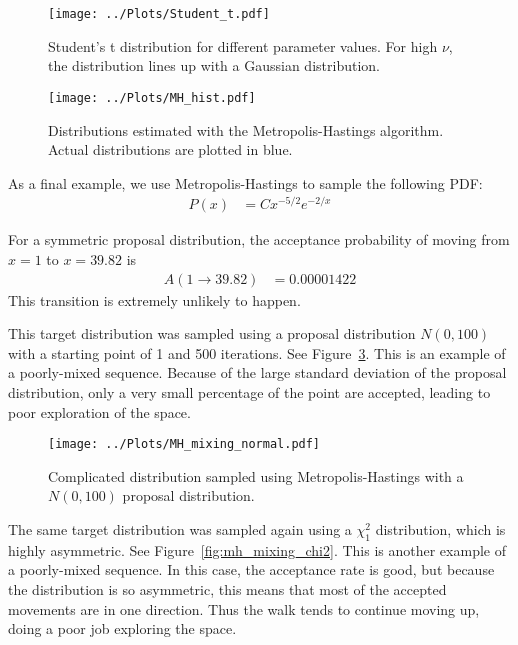 \documentclass[twocolumn]{myarticle}
\begin{document}
\begin{figure}[ht!]
    \begin{center}
    \texttt{[image: ../Plots/Student\_t.pdf]}
    \caption{%
        Student's t distribution for different parameter values.
        For high $ \nu $, the distribution lines up with a Gaussian distribution.
    }
    \label{fig:student_t}
    \end{center}
\end{figure}


\begin{figure}[ht!]
    \begin{center}
    \texttt{[image: ../Plots/MH\_hist.pdf]}
    \caption{%
        Distributions estimated with the Metropolis-Hastings algorithm.
        Actual distributions are plotted in blue.
    }
    \label{fig:mh_hist}
    \end{center}
\end{figure}

As a final example, we use Metropolis-Hastings to sample the following PDF:
\begin{align}
    P(x) &= C x^{-5/2} e^{-2/x}
\end{align}

For a symmetric proposal distribution, the acceptance probability of moving from $ x = 1 $ to $ x = 39.82 $ is
\begin{align}
    A(1 \to 39.82) &= 0.00001422
\end{align}
This transition is extremely unlikely to happen.

This target distribution was sampled using a proposal distribution $ N(0, 100) $ with a starting point of 1 and 500 iterations.
See Figure~\ref{fig:mh_mixing_normal}.
This is an example of a poorly-mixed sequence.
Because of the large standard deviation of the proposal distribution, only a very small percentage of the point are accepted, leading to poor exploration of the space.

\begin{figure}[ht!]
    \begin{center}
    \texttt{[image: ../Plots/MH\_mixing\_normal.pdf]}
    \caption{%
        Complicated distribution sampled using Metropolis-Hastings with a $ N(0, 100) $ proposal distribution.
    }
    \label{fig:mh_mixing_normal}
    \end{center}
\end{figure}

The same target distribution was sampled again using a $ \chi^2_1 $ distribution, which is highly asymmetric.
See Figure~\ref{fig:mh_mixing_chi2}.
This is another example of a poorly-mixed sequence.
In this case, the acceptance rate is good, but because the distribution is so asymmetric, this means that most of the accepted movements are in one direction.
Thus the walk tends to continue moving up, doing a poor job exploring the space.
\end{document}
